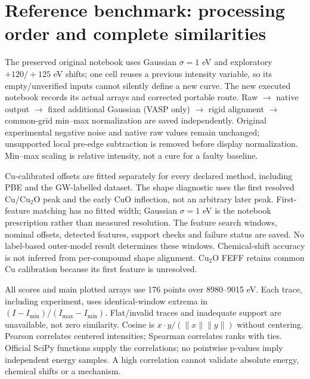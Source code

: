 \documentclass[11pt,a4paper]{article}
\begin{document}
\section{Reference benchmark: processing order and complete similarities}
The preserved original notebook uses Gaussian $\sigma=1$ eV and exploratory $+120/+125$ eV shifts; one cell reuses a previous intensity variable, so its empty/unverified inputs cannot silently define a new curve. The new executed notebook records its actual arrays and corrected portable route. Raw $\rightarrow$ native output $\rightarrow$ fixed additional Gaussian (VASP only) $\rightarrow$ rigid alignment $\rightarrow$ common-grid min--max normalization are saved independently. Original experimental negative noise and native raw values remain unchanged; unsupported local pre-edge subtraction is removed before display normalization. Min--max scaling is relative intensity, not a cure for a faulty baseline.

Cu-calibrated offsets are fitted separately for every declared method, including PBE and the GW-labelled dataset. The shape diagnostic uses the first resolved Cu/Cu$_2$O peak and the early CuO inflection, not an arbitrary later peak. First-feature matching has no fitted width; Gaussian $\sigma=1$ eV is the notebook prescription rather than measured resolution. The feature search windows, nominal offsets, detected features, support checks and failure status are saved. No label-based outer-model result determines these windows. Chemical-shift accuracy is not inferred from per-compound shape alignment. Cu$_2$O FEFF retains common Cu calibration because its first feature is unresolved.

All scores and main plotted arrays use 176 points over 8980--9015 eV. Each trace, including experiment, uses identical-window extrema in $(I-I_{\min})/(I_{\max}-I_{\min})$. Flat/invalid traces and inadequate support are unavailable, not zero similarity. Cosine is $x\cdot y/(\|x\|\|y\|)$ without centering. Pearson correlates centered intensities; Spearman correlates ranks with ties. Official SciPy functions supply the correlations; no pointwise p-values imply independent energy samples. A high correlation cannot validate absolute energy, chemical shifts or a mechanism.
\end{document}
